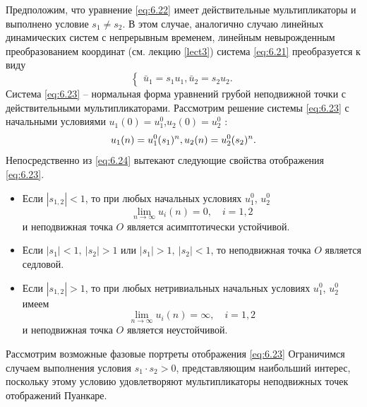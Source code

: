 Предположим, что уравнение \eqref{eq:6.22} имеет действительные мультипликаторы и выполнено условие $s_1 \neq s_2$. В этом случае, аналогично случаю линейных динамических систем с непрерывным временем, линейным невырожденным преобразованием координат (см. лекцию \ref{lect3}) система \eqref{eq:6.21} преобразуется к виду
\begin{equation}
        \label{eq:6.23}
        \begin{cases}
                \bar u_1 = s_1 u_1,
               \bar u_2 = s_2 u_2. 
        \end{cases}
\end{equation}
Система \eqref{eq:6.23} -- нормальная форма уравнений грубой неподвижной точки с действительными мультипликаторами. Рассмотрим решение системы \eqref{eq:6.23} с начальными условиями $u_1(0)=u_1^0$,$u_2(0) = u_2^0$ :
\begin{equation}
        \label{eq:6.24}
        u_1(n)  = u_1^0 (s_1)^n,\\
        u_2(n) = u_2^0(s_2)^n.
\end{equation}
Непосредственно из \eqref{eq:6.24} вытекают следующие свойства отображения \eqref{eq:6.23}.
\begin{itemize}
        \item Если $|s_{1,2}| <1$, то при любых начальных условиях $u_1^0$, $u_2^0$ 
                \begin{equation}
                        \label{eq:}
                        \lim_{n \to \infty} u_i(n) = 0, \quad i=1,2
                \end{equation}
                и неподвижная точка $O$ является асимптотически устойчивой.
        \item Если $|s_1|<1, ~ |s_2|>1$ или $|s_1|>1,~ |s_2|<1$, то неподвижная точка $O$ 
                        является седловой.
        \item Если $|s_{1,2}|>1$, то при любых нетривиальных начальных условиях $u_1^0$, $u_2^0$ 
                имеем
                \begin{equation}
                        \label{eq:}
                        \lim_{n \to \infty} u_i(n) = \infty,\quad i=1,2
                \end{equation}
                и неподвижная точка $O$ является неустойчивой.
\end{itemize}

Рассмотрим возможные фазовые портреты отображения \eqref{eq:6.23} Ограничимся случаем выполнения условия $s_1 \cdot s_2 >0$, представляющим наибольший интерес, поскольку этому условию удовлетворяют
мультипликаторы неподвижных точек отображений Пуанкаре.


